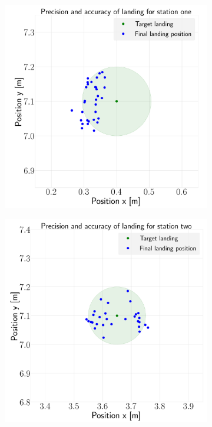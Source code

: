 \documentclass[../Head/report.tex]{subfiles}
\begin{document}
\begin{figure}[H]
    \centering
    \begin{subfigure}[t]{.30\textwidth}
        \centering
        \includegraphics[width=\textwidth]{../Figures/landing_test/test3_speed_0.9_error_0.1/landing_for_station_one.png}
        \caption{}
        \label{fig:vision_based_landing_landing_station_one_test3}
    \end{subfigure}
     \hspace{0.2em}
    \begin{subfigure}[t]{.30\textwidth}
        \centering
        \includegraphics[width=\textwidth]{../Figures/landing_test/test3_speed_0.9_error_0.1/landing_for_station_two.png}

\end{subfigure}
\end{figure}
\end{document}
